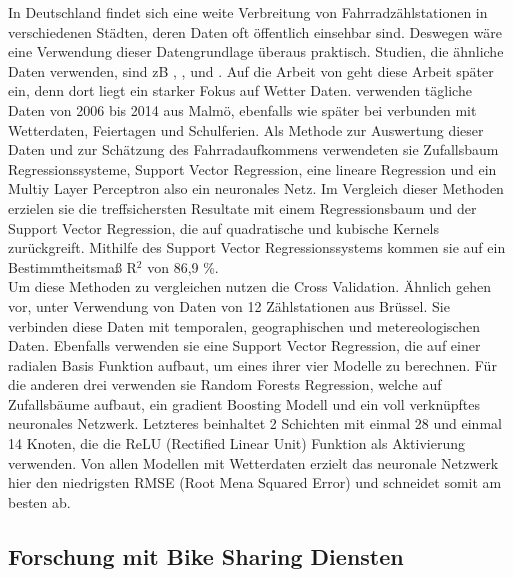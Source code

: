 \documentclass[a4paper,12pt]{thesis}
\begin{document}
In Deutschland findet sich eine weite Verbreitung von Fahrradzählstationen in verschiedenen Städten, deren Daten oft öffentlich einsehbar sind. Deswegen wäre eine Verwendung dieser Datengrundlage überaus praktisch. Studien, die ähnliche Daten verwenden, sind zB \cite{Holmgren2017}, \cite{Broucke2019}, \cite{Wessel2020} und \cite{Goldmann2021}. Auf die Arbeit von \cite{Wessel2020} geht diese Arbeit später ein, denn dort liegt ein starker Fokus auf Wetter Daten. \cite{Holmgren2017} verwenden tägliche Daten von 2006 bis 2014 aus Malmö, ebenfalls wie später bei \cite{Wessel2020} verbunden mit Wetterdaten, Feiertagen und Schulferien. Als Methode zur Auswertung dieser Daten und zur Schätzung des Fahrradaufkommens verwendeten sie Zufallsbaum Regressionssysteme, Support Vector Regression, eine lineare Regression und ein Multiy Layer Perceptron also ein neuronales Netz. Im Vergleich dieser Methoden erzielen sie die treffsichersten Resultate mit einem Regressionsbaum und der Support Vector Regression, die auf quadratische und kubische Kernels zurückgreift. Mithilfe des Support Vector Regressionssystems kommen sie auf ein Bestimmtheitsmaß R$^2$ von 86,9 \%.\\
Um diese Methoden zu vergleichen nutzen \cite{Holmgren2017} die Cross Validation. Ähnlich gehen \cite{Broucke2019} vor, unter Verwendung von Daten von 12 Zählstationen aus Brüssel. Sie verbinden diese Daten mit temporalen, geographischen und metereologischen Daten. Ebenfalls verwenden sie eine Support Vector Regression, die auf einer radialen Basis Funktion aufbaut, um eines ihrer vier Modelle zu berechnen. Für die anderen drei verwenden sie Random Forests Regression, welche auf Zufallsbäume aufbaut, ein gradient Boosting Modell und ein voll verknüpftes neuronales Netzwerk. Letzteres beinhaltet 2 Schichten mit einmal 28 und einmal 14 Knoten, die die ReLU (Rectified Linear Unit) Funktion als Aktivierung verwenden. Von allen Modellen mit Wetterdaten erzielt das neuronale Netzwerk hier den niedrigsten RMSE (Root Mena Squared Error) und schneidet somit am besten ab.

\subsection{Forschung mit Bike Sharing Diensten}
\end{document}

